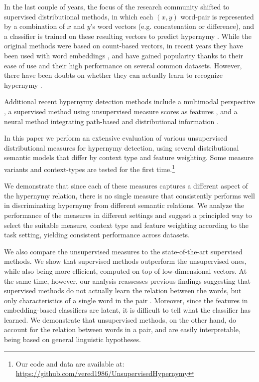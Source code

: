 \documentclass[11pt]{article}
\begin{document}
In the last couple of years, the focus of the research community shifted to supervised distributional methods, in which each $(x,y)$ word-pair is represented by a combination of $x$ and $y$'s word vectors (e.g. concatenation or difference), and a classifier is trained on these resulting vectors to predict hypernymy \cite{baroni2012entailment,roller2014inclusive,weeds2014learning}. While the original methods were based on count-based vectors, in recent years they have been used with word embeddings \cite{mikolov2013distributed,pennington2014glove}, and have gained popularity thanks to their ease of use and their high performance on several common datasets. However, there have been doubts on whether they can actually learn to recognize hypernymy \cite{levy2015supervised}.

Additional recent hypernymy detection methods include a multimodal perspective \cite{kiela2015exploiting}, a supervised method using unsupervised measure scores as features \cite{santus2016nine}, and a neural method integrating path-based and distributional information \cite{shwartz2016improving}. 

In this paper we perform an extensive evaluation of various unsupervised distributional measures for hypernymy detection, using several distributional semantic models that differ by context type and feature weighting. Some measure variants and context-types are tested for the first time.\footnote{Our code and data are available at:\\\scriptsize{\url{https://github.com/vered1986/UnsupervisedHypernymy}}}

We demonstrate that since each of these measures captures a different aspect of the hypernymy relation, there is no single measure that consistently performs well in discriminating hypernymy from different semantic relations. We analyze the performance of the measures in different settings and suggest a principled way to select the suitable measure, context type and feature weighting according to the task setting, yielding consistent performance across datasets. 

We also compare the unsupervised measures to the state-of-the-art supervised methods. We show that supervised methods outperform the unsupervised ones, while also being more efficient, computed on top of low-dimensional vectors. At the same time, however, our analysis reassesses previous findings suggesting that supervised methods do not actually learn the relation between the words, but only characteristics of a single word in the pair \cite{levy2015supervised}. Moreover, since the features in embedding-based classifiers are latent, it is difficult to tell what the classifier has learned. We demonstrate that unsupervised methods, on the other hand, do account for the relation between words in a pair, and are easily interpretable, being based on general linguistic hypotheses.
\end{document}
